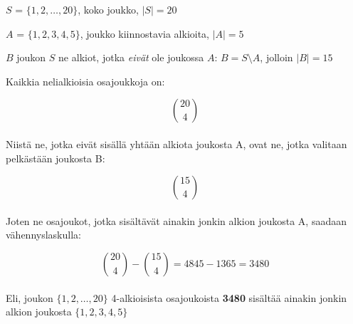 \documentclass[12pt,a4paper]{article}
\begin{document}
\begin{kuvaus}
  \item $S$ = $\{1,2,\ldots,20\}$, koko joukko, $|S| = 20$
  \item $A$ = $\{1, 2, 3, 4, 5\}$, joukko kiinnostavia alkioita, $|A| = 5$
  \item $B$ joukon $S$ ne alkiot, jotka \emph{eivät} ole joukossa
  $A$: $B = S \setminus A$, jolloin $|B| = 15$
\end{kuvaus}

Kaikkia nelialkioisia osajoukkoja on:

\[
\binom{20}{4}
\]
\\
Niistä ne, jotka eivät sisällä yhtään alkiota joukosta A,
ovat ne, jotka valitaan pelkästään joukosta B:

\[
\binom{15}{4}
\]
\\
Joten ne osajoukot, jotka sisältävät ainakin jonkin alkion joukosta
A, saadaan vähennyslaskulla:

\[
\binom{20}{4} - \binom{15}{4} = 4845 - 1365 = 3480
\]
\\
Eli, joukon $\{1,2,\ldots,20\}$ 4-alkioisista osajoukoista \textbf{3480} sisältää ainakin jonkin alkion joukosta $\{1, 2, 3, 4, 5\}$
\end{document}
